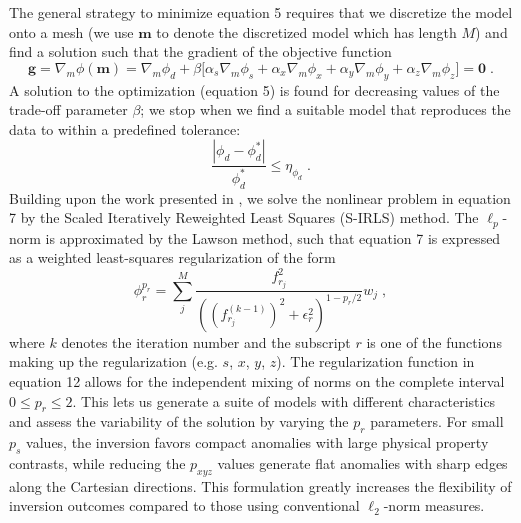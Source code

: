 \documentclass[paper]{geophysics}
\begin{document}
The general strategy to minimize equation 5 requires that we discretize the model onto a mesh (we use $\mathbf{m}$ to denote the discretized model which has length $M$) and find a  solution such that the gradient of the objective function
\begin{equation}\label{gradPhi}
\mathbf{g} = \nabla_m \phi(\mathbf{m}) = \nabla_m \phi_d + \beta \bigg[ \alpha_s \nabla_m \phi_s + \alpha_x \nabla_m \phi_x + \alpha_y \nabla_m \phi_y + \alpha_z \nabla_m \phi_z \bigg] = \mathbf{0} \;.
\end{equation}
A solution to the optimization (equation 5) is found for decreasing values of the trade-off parameter $\beta$; we stop when we find a suitable model that reproduces the data to within a predefined tolerance:
\begin{equation}\label{phidTol}
\frac{|\phi_d- \phi_d^*|}{\phi_d^*} \leq \eta_{\phi_d}\;.
\end{equation}
Building upon the work presented in \cite{FournierDWO2019}, we solve the nonlinear problem in equation 7 by the Scaled Iteratively Reweighted Least Squares (S-IRLS) method.
The $\ell_p$-norm is approximated by the Lawson method, such that equation 7 is expressed as a weighted least-squares regularization of the form
\begin{equation} \label{eq:IRLS}
\phi_r^{p_r} = \sum_{j}^M\frac{f_{r_j}^2}{{{((f_{r_j}^{(k-1)})^{2} + \epsilon_r^2 )}^{1-p_r/2}} }w_j\;,
\end{equation}
where $k$ denotes the iteration number and the subscript $r$ is one of the functions making up the regularization (e.g. $s$, $x$, $y$, $z$). The regularization function in equation 12 allows for the independent mixing of norms on the complete interval $0 \leq p_r \leq 2$. This lets us generate a suite of models with different characteristics and assess the variability of the solution by varying the $p_r$ parameters. For small $p_s$ values, the inversion favors compact anomalies with large physical property contrasts, while reducing the $p_{xyz}$ values generate flat anomalies with sharp edges along the Cartesian directions. This formulation greatly increases the flexibility of inversion outcomes compared to those using conventional $\ell_2$-norm measures.
\end{document}
